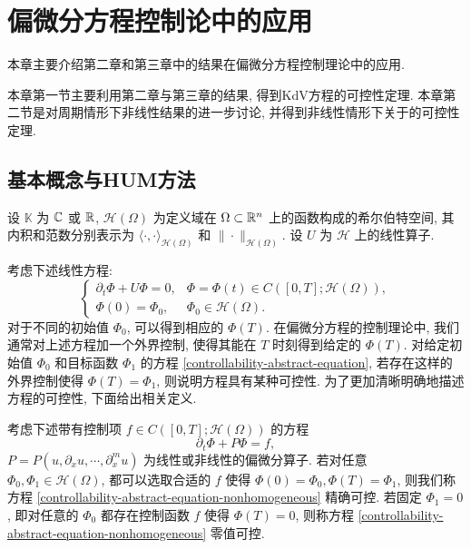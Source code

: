 \chapter{偏微分方程控制论中的应用}
本章主要介绍第二章和第三章中的结果在偏微分方程控制理论中的应用.

本章第一节主要利用第二章与第三章的结果, 得到KdV方程的可控性定理. 本章第二节是对周期情形下非线性结果的进一步讨论, 并得到非线性情形下关于的可控性定理.

\section{基本概念与HUM方法}
设 $\mathbb{K}$ 为 $\mathbb{C}$ 或 $\mathbb{R}$, $\mathcal{H}(\Omega)$ 为定义域在 $\Omega\subset \mathbb{R}^n$ 上的函数构成的希尔伯特空间, 其内积和范数分别表示为 $\langle \cdot,\cdot \rangle_{\mathcal{H}(\Omega)}$ 和 $\|\cdot\|_{\mathcal{H}(\Omega)}$. 设 $U$ 为 $\mathcal{H}$ 上的线性算子. 


考虑下述线性方程:
\begin{equation}
    \left\lbrace\begin{array}{ll}
        \partial_t \Phi+U\Phi=0, & \Phi=\Phi(t)\in C([0,T];\mathcal{H}(\Omega)), \\
         \Phi(0)=\Phi_0,& \Phi_0\in \mathcal{H}(\Omega). 
    \end{array}
    \right.\label{controllability-abstract-equation}
\end{equation}
对于不同的初始值 $\Phi_0$, 可以得到相应的 $\Phi(T)$. 在偏微分方程的控制理论中, 我们通常对上述方程加一个外界控制, 使得其能在 $T$ 时刻得到给定的 $\Phi(T)$. 对给定初始值 $\Phi_0$ 和目标函数 $\Phi_1$ 的方程 \eqref{controllability-abstract-equation}, 若存在这样的外界控制使得 $\Phi(T)=\Phi_1$, 则说明方程具有某种可控性. 为了更加清晰明确地描述方程的可控性, 下面给出相关定义. 
\begin{definition}
 考虑下述带有控制项 $f\in C([0,T];\mathcal{H}(\Omega))$ 的方程
\begin{equation}
        \partial_t \Phi+P\Phi=f, 
    \label{controllability-abstract-equation-nonhomogeneous}  
\end{equation}
$P=P(u,\partial_x u,\cdots,\partial_x^m u)$ 为线性或非线性的偏微分算子. 若对任意 $\Phi_0,\Phi_1\in \mathcal{H}(\Omega)$, 都可以选取合适的 $f$ 使得 $\Phi(0)=\Phi_0, \Phi(T)=\Phi_1$, 则我们称方程 \eqref{controllability-abstract-equation-nonhomogeneous} 精确可控. 若固定 $\Phi_1=0$, 即对任意的 $\Phi_0$ 都存在控制函数 $f$ 使得 $\Phi(T)=0$, 则称方程 \eqref{controllability-abstract-equation-nonhomogeneous} 零值可控. 
\end{definition}

